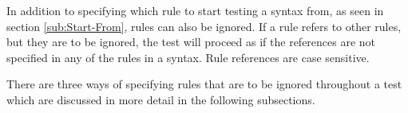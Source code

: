 In addition to specifying which rule to start testing a syntax from, as seen
in section \ref{sub:Start-From}, rules can also be ignored. If a rule refers
to other rules, but they are to be ignored, the test will proceed as if the 
references are not specified in any of the rules in a syntax. Rule references
are case sensitive.

There are three ways of specifying rules that are to be ignored throughout a
test which are discussed in more detail in the following subsections.